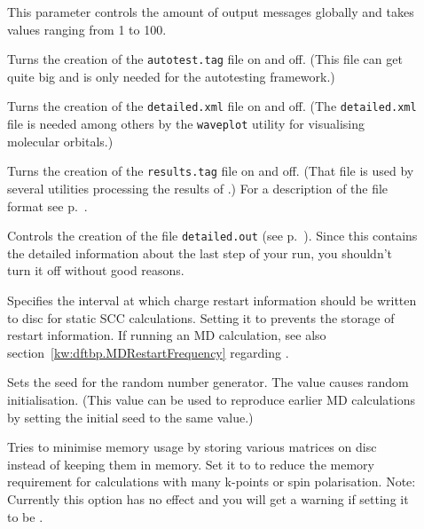 \begin{description}

\item[] This parameter controls the amount of output messages globally
    and takes values ranging from 1 to 100.  

\item[] Turns the creation of the
  \verb|autotest.tag| file on and off. (This file can get quite big
  and is only needed for the autotesting framework.)

\item[] Turns the creation of the
  \verb|detailed.xml| file on and off. (The \verb|detailed.xml| file
  is needed among others by the \verb|waveplot| utility for
  visualising molecular orbitals.)

\item[] Turns the creation of the \verb|results.tag| file on
  and off. (That file is used by several utilities processing the results of
  \dftbp.) For a description of the file format see
  p.~.

\item[] Controls the creation of the file
  \verb|detailed.out| (see p.~). Since this contains
  the detailed information about the last step of your run, you shouldn't turn
  it off without good reasons.

\item[] Specifies the interval at which charge
  restart information should be written to disc for static SCC
  calculations. Setting it to  prevents the storage of restart
  information. If running an MD calculation, see also
  section~\ref{kw:dftbp.MDRestartFrequency} regarding .

\item[] Sets the seed for the random number
  generator. The value  causes random initialisation. (This
  value can be used to reproduce earlier MD calculations by setting
  the initial seed to the same value.)

\item[] Tries to minimise memory usage by
  storing various matrices on disc instead of keeping them in memory.
  Set it to  to reduce the memory requirement for calculations
  with many k-points or spin polarisation. Note: Currently this option has no
  effect and you will get a warning if setting it to be .


\end{description}

